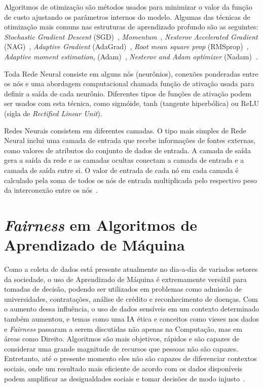 \documentclass[Portugues,Final]{ic-tese-v3}
\begin{document}
Algoritmos de otimização são métodos usados para minimizar o valor da função de custo ajustando os parâmetros internos do modelo. Algumas das técnicas de otimização mais comuns nas estruturas de aprendizado profundo são as seguintes: \textit{Stochastic Gradient Descent} (SGD)~\cite{Schmidt_2013}, \textit{Momentum}~\cite{Polyak_1964}, \textit{Nesterov Accelerated Gradient} (NAG)~\cite{Sutskever_2013}, \textit{Adaptive Gradient} (AdaGrad)~\cite{Duchi_2011}, \textit{Root mean square prop} (RMSprop)~\cite{Graves_2013}, \textit{Adaptive moment estimation}, (Adam)~\cite{Kingma_2014}, \textit{Nesterov and Adam optimizer} (Nadam)~\cite{Dozat_2016}.

Toda Rede Neural consiste em alguns nós (neurônios), conexões ponderadas entre os nós e uma abordagem computacional chamada função de ativação usada para definir a saída de cada neurônio. Diferentes tipos de funções de ativação podem ser usados com esta técnica, como sigmóide, tanh (tangente hiperbólica) ou ReLU (sigla de \textit{Rectified Linear Unit}).

Redes Neurais consistem em diferentes camadas. O tipo mais simples de Rede Neural inclui uma camada de entrada que recebe informações de fontes externas, como valores de atributos do conjunto de dados de entrada. A camada de saída gera a saída da rede e as camadas ocultas conectam a camada de entrada e a camada de saída entre si. O valor de entrada de cada nó em cada camada é calculado pela soma de todos os nós de entrada multiplicada pelo respectivo peso da interconexão entre os nós~\cite{Erb_1993}.

\section{\textit{Fairness} em Algoritmos de Aprendizado de Máquina}
\label{sec:Fairness}

Como a coleta de dados está presente atualmente no dia-a-dia de variados setores da sociedade, o uso de Aprendizado de Máquina é extremamente versátil para tomadas de decisão, podendo ser utilizados em problemas como admissão de universidades, contratações, análise de crédito e reconhecimento de doenças. Com o aumento dessa influência, o uso de dados sensíveis em um contexto determinado também aumentou, e temas como uma IA ética e conceitos como vieses nos dados e \textit{Fairness} passaram a serem discutidas não apenas na Computação, mas em áreas como Direito. Algoritmos são mais objetivos, rápidos e são capazes de considerar uma grande magnitude de recursos que pessoas não são capazes. Entretanto, até o presente momento eles não são capazes de diferenciar contextos sociais, onde um resultado mais eficiente de acordo com os dados disponíveis podem amplificar as desigualdades sociais e tomar decisões de modo injusto~\cite{Mehrabi_2021}. 
\end{document}
